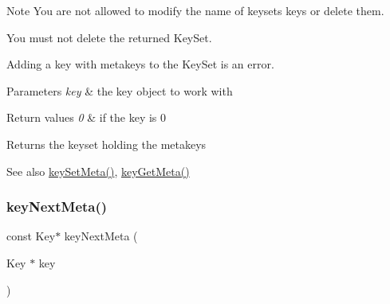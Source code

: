 \begin{DoxyCodeInclude}{0}
\end{DoxyCodeInclude}
 \begin{DoxyNote}{Note}
You are not allowed to modify the name of keyset\textquotesingle{}s keys or delete them. 

You must not delete the returned Key\+Set. 

Adding a key with metakeys to the Key\+Set is an error.
\end{DoxyNote}

\begin{DoxyParams}{Parameters}
{\em key} & the key object to work with \\
\hline
\end{DoxyParams}

\begin{DoxyRetVals}{Return values}
{\em 0} & if the key is 0 \\
\hline
\end{DoxyRetVals}
\begin{DoxyReturn}{Returns}
the keyset holding the metakeys 
\end{DoxyReturn}
\begin{DoxySeeAlso}{See also}
\mbox{\hyperlink{group__keymeta_gae1f15546b234ffb6007d8a31178652b9}{key\+Set\+Meta()}}, \mbox{\hyperlink{group__keymeta_ga9ed3875495ddb3d8a8d29158a60a147c}{key\+Get\+Meta()}} 
\end{DoxySeeAlso}
\mbox{\label{group__keymeta_ga4c88342f580a4291455a801af71ce048}} 
\subsubsection{\texorpdfstring{keyNextMeta()}{keyNextMeta()}}
{\footnotesize\ttfamily const Key$\ast$ key\+Next\+Meta (\begin{DoxyParamCaption}\item[{Key $\ast$}]{key }\end{DoxyParamCaption})}



